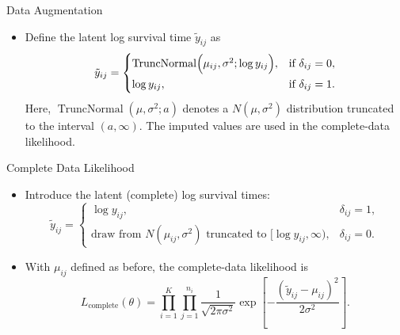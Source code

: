 \documentclass{beamer}
\begin{document}
\begin{frame}{ Data Augmentation}
  \begin{itemize}
    \item  Define the latent log survival time \( \tilde{y}_{ij}\) as
      \[
      \tilde{y}_{ij} =
      \begin{cases}
        \operatorname{TruncNormal}\Bigl(\mu_{ij},\sigma^2;\log y_{ij}\Bigr), & \text{if } \delta_{ij}=0, \\[1ex]
        \log y_{ij}, & \text{if } \delta_{ij}=1.
      \end{cases}
      \]
      Here, \(\operatorname{TruncNormal}(\mu,\sigma^2;a)\) denotes a \(N(\mu,\sigma^2)\) distribution truncated to the interval \((a,\infty)\). The imputed values are used in the complete-data likelihood.
  \end{itemize}
\end{frame}

\begin{frame}{Complete Data Likelihood}
  \begin{itemize}
    \item Introduce the latent (complete) log survival times:
      \[
      \tilde{y}_{ij} =
      \begin{cases}
        \log y_{ij}, & \delta_{ij}=1, \\[1ex]
        \text{draw from } N(\mu_{ij},\sigma^2) \text{ truncated to } [\log y_{ij},\infty), & \delta_{ij}=0.
      \end{cases}
      \]
    \item With \(\mu_{ij}\) defined as before, the complete-data likelihood is
      \[
      L_{\text{complete}}(\theta) = \prod_{i=1}^K \prod_{j=1}^{n_i} \frac{1}{\sqrt{2\pi\sigma^2}}
      \exp\!\left[-\frac{(\tilde{y}_{ij} - \mu_{ij})^2}{2\sigma^2}\right].
      \]
  \end{itemize}
\end{frame}
\end{document}

